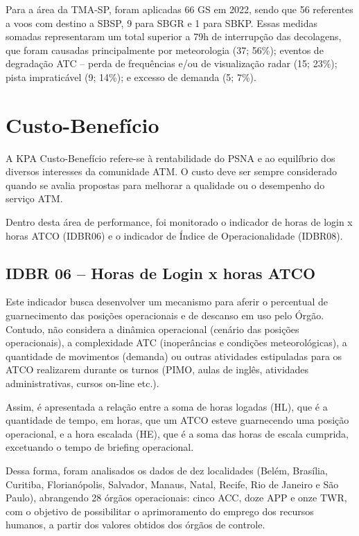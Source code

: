 \documentclass[
]{book}
\begin{document}
Para a área da TMA-SP, foram aplicadas 66 GS em 2022, sendo que 56 referentes a voos com destino a SBSP, 9 para SBGR e 1 para SBKP. Essas medidas somadas representaram um total superior a 79h de interrupção das decolagens, que foram causadas principalmente por meteorologia (37; 56\%); eventos de degradação ATC -- perda de frequências e/ou de visualização radar (15; 23\%); pista impraticável (9; 14\%); e excesso de demanda (5; 7\%).

\hypertarget{custo-benefuxedcio}{%
\section{Custo-Benefício}\label{custo-benefuxedcio}}

A KPA Custo-Benefício refere-se à rentabilidade do PSNA e ao equilíbrio dos diversos interesses da comunidade ATM. O custo deve ser sempre considerado quando se avalia propostas para melhorar a qualidade ou o desempenho do serviço ATM.

Dentro desta área de performance, foi monitorado o indicador de horas de login x horas ATCO (IDBR06) e o indicador de Índice de Operacionalidade (IDBR08).

\hypertarget{idbr-06-horas-de-login-x-horas-atco}{%
\subsection{IDBR 06 -- Horas de Login x horas ATCO}\label{idbr-06-horas-de-login-x-horas-atco}}

Este indicador busca desenvolver um mecanismo para aferir o percentual de guarnecimento das posições operacionais e de descanso em uso pelo Órgão. Contudo, não considera a dinâmica operacional (cenário das posições operacionais), a complexidade ATC (inoperâncias e condições meteorológicas), a quantidade de movimentos (demanda) ou outras atividades estipuladas para os ATCO realizarem durante os turnos (PIMO, aulas de inglês, atividades administrativas, cursos on-line etc.).

Assim, é apresentada a relação entre a soma de horas logadas (HL), que é a quantidade de tempo, em horas, que um ATCO esteve guarnecendo uma posição operacional, e a hora escalada (HE), que é a soma das horas de escala cumprida, excetuando o tempo de briefing operacional.

Dessa forma, foram analisados os dados de dez localidades (Belém, Brasília, Curitiba, Florianópolis, Salvador, Manaus, Natal, Recife, Rio de Janeiro e São Paulo), abrangendo 28 órgãos operacionais: cinco ACC, doze APP e onze TWR, com o objetivo de possibilitar o aprimoramento do emprego dos recursos humanos, a partir dos valores obtidos dos órgãos de controle.
\end{document}
